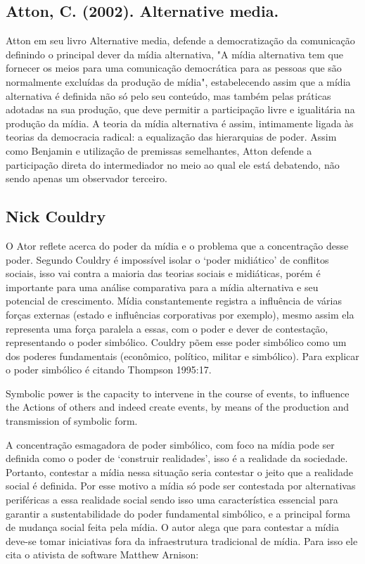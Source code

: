 \subsection{Atton, C. (2002). Alternative media.}
Atton em seu livro Alternative media, defende a democratização da comunicação definindo o principal dever da mídia alternativa, "A mídia alternativa tem que fornecer os meios para uma comunicação democrática para as pessoas que são normalmente excluídas da produção de mídia", estabelecendo assim que a mídia alternativa é definida não só pelo seu conteúdo, mas também pelas práticas adotadas na sua produção, que deve permitir a participação livre e igualitária na produção da mídia. A teoria da mídia alternativa é assim, intimamente ligada às teorias da democracia radical: a equalização das hierarquias de poder. Assim como Benjamin e utilização de premissas semelhantes, Atton defende a participação direta do intermediador no meio ao qual ele está debatendo, não sendo apenas um observador terceiro. 

\subsection{Nick Couldry}
O Ator reflete acerca do poder da mídia e o problema que a concentração desse poder. Segundo Couldry é impossível isolar o ‘poder midiático' de conflitos sociais, isso vai contra a maioria das teorias sociais e midiáticas, porém é importante para uma análise comparativa para a mídia alternativa e seu potencial de crescimento.
Mídia constantemente registra a influência de várias forças externas (estado e influências corporativas por exemplo), mesmo assim ela representa uma força paralela a essas, com o poder e dever de contestação, representando o poder simbólico. Couldry põem esse poder simbólico como um dos poderes fundamentais (econômico, político, militar e simbólico). Para explicar o poder simbólico é citando Thompson 1995:17.
\begin{directcite}
Symbolic power is the capacity to intervene in the course of events, to influence the 
Actions of others and indeed create events, by means of the production and transmission of symbolic form.
\end{directcite}

A concentração esmagadora de poder simbólico, com foco na mídia pode ser definida como o poder de ‘construir realidades’, isso é a realidade da sociedade. Portanto, contestar a mídia nessa situação seria contestar o jeito que a realidade social é definida.
Por esse motivo a mídia só pode ser contestada por alternativas periféricas a essa realidade social sendo isso uma característica essencial  para garantir a sustentabilidade  do poder fundamental simbólico, e  a principal forma de mudança social feita pela mídia.
O autor alega que para contestar a mídia deve-se tomar iniciativas fora da infraestrutura tradicional de mídia. Para  isso ele  cita o ativista de software Matthew Arnison:

